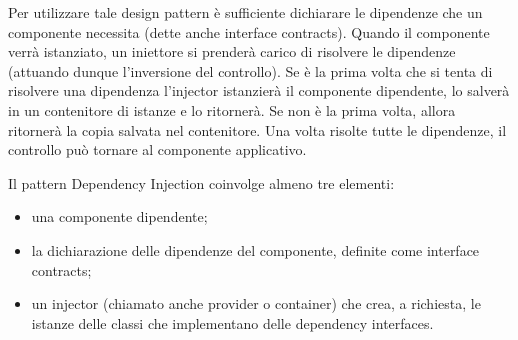 Per utilizzare tale design pattern è sufficiente dichiarare le dipendenze che un componente necessita (dette anche interface contracts). Quando il componente verrà istanziato, un iniettore si prenderà carico di risolvere le dipendenze (attuando dunque l'inversione del controllo). Se è la prima volta che si tenta di risolvere una dipendenza l'injector istanzierà il componente dipendente, lo salverà in un contenitore di istanze e lo ritornerà. Se non è la prima volta, allora ritornerà la copia salvata nel contenitore. Una volta risolte tutte le dipendenze, il controllo può tornare al componente applicativo.

Il pattern Dependency Injection coinvolge almeno tre elementi:
\begin{itemize}
\item una componente dipendente;
\item la dichiarazione delle dipendenze del componente, definite come interface contracts;
\item un injector (chiamato anche provider o container) che crea, a richiesta, le istanze delle classi che implementano delle dependency interfaces.
\end{itemize}